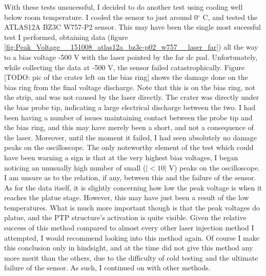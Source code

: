 \documentclass{report}
\begin{document}
            With these tests unsucessful, I decided to do another test using cooling well below room temperature. I cooled the sensor to just around 0$^\circ$ C, and tested the ATLAS12A BZ3C W757-P2 sensor. This may have been the single most sucessful test I performed, obtaining data (figure \ref{fig:Peak_Voltage__151008_atlas12a_bz3c-p02_w757__laser_far}) all the way to a bias voltage -500 V with the laser pointed by the far dc pad. Unfortunately, while collecting the data at -500 V, the sensor failed catastrophically. Figure [TODO: pic of the crater left on the bias ring] shows the damage done on the bias ring from the final voltage discharge. Note that this is on the bias ring, not the strip, and was not caused by the laser directly. The crater was directly under the bias probe tip, indicating a large electrical discharge between the two. I had been having a number of issues maintaining contact between the probe tip and the bias ring, and this may have merely been a short, and not a consequence of the laser. Moreover, until the moment it failed, I had seen absolutely no damage peaks on the oscilloscope. The only noteworthy element of the test which could have been warning a sign is that at the very highest bias voltages, I began noticing an unusually high number of small ($|< 10|$ V) peaks on the oscilloscope. I am unsure as to the relation, if any, between this and the failure of the sensor. As for the data itself, it is slightly concerning how low the peak voltage is when it reaches the platue stage. However, this may have just been a result of the low temperatures. What is much more important though is that the peak voltages do platue, and the PTP structure's activation is quite visible. Given the relative success of this method compared to almost every other laser injection method I attempted, I would recommend looking into this method again. Of course I make this conclusion only in hindsight, and at the time did not give this method any more merit than the others, due to the difficulty of cold testing and the ultimate failure of the sensor. As such, I continued on with other methods.


            
\end{document}

